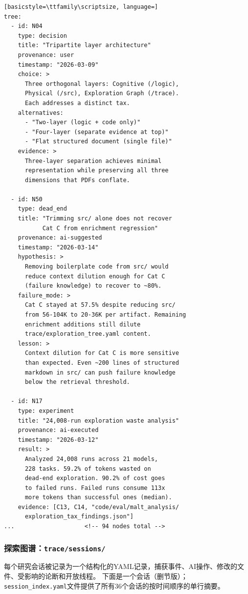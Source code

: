 \begin{lstlisting}[basicstyle=\ttfamily\scriptsize, language=]
tree:
  - id: N04
    type: decision
    title: "Tripartite layer architecture"
    provenance: user
    timestamp: "2026-03-09"
    choice: >
      Three orthogonal layers: Cognitive (/logic),
      Physical (/src), Exploration Graph (/trace).
      Each addresses a distinct tax.
    alternatives:
      - "Two-layer (logic + code only)"
      - "Four-layer (separate evidence at top)"
      - "Flat structured document (single file)"
    evidence: >
      Three-layer separation achieves minimal
      representation while preserving all three
      dimensions that PDFs conflate.

  - id: N50
    type: dead_end
    title: "Trimming src/ alone does not recover
           Cat C from enrichment regression"
    provenance: ai-suggested
    timestamp: "2026-03-14"
    hypothesis: >
      Removing boilerplate code from src/ would
      reduce context dilution enough for Cat C
      (failure knowledge) to recover to ~80%.
    failure_mode: >
      Cat C stayed at 57.5% despite reducing src/
      from 56-104K to 20-36K per artifact. Remaining
      enrichment additions still dilute
      trace/exploration_tree.yaml content.
    lesson: >
      Context dilution for Cat C is more sensitive
      than expected. Even ~200 lines of structured
      markdown in src/ can push failure knowledge
      below the retrieval threshold.

  - id: N17
    type: experiment
    title: "24,008-run exploration waste analysis"
    provenance: ai-executed
    timestamp: "2026-03-12"
    result: >
      Analyzed 24,008 runs across 21 models,
      228 tasks. 59.2% of tokens wasted on
      dead-end exploration. 90.2% of cost goes
      to failed runs. Failed runs consume 113x
      more tokens than successful ones (median).
    evidence: [C13, C14, "code/eval/malt_analysis/
      exploration_tax_findings.json"]
...                    <!-- 94 nodes total -->
\end{lstlisting}

\subsubsection{探索图谱：\texttt{trace/sessions/}}

每个研究会话被记录为一个结构化的YAML记录，捕获事件、AI操作、修改的文件、受影响的论断和开放线程。
下面是一个会话（删节版）；\texttt{session\_index.yaml}文件提供了所有36个会话的按时间顺序的单行摘要。

